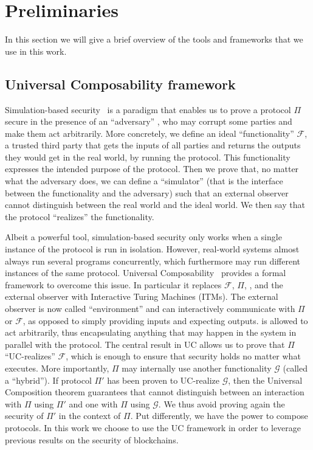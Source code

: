 \section{Preliminaries}
  In this section we will give a brief overview of the tools and frameworks that
  we use in this work.

  \subsection{Universal Composability framework}
    Simulation-based security~\cite{howtosimulateit} is a paradigm that enables
    us to prove a protocol $\Pi$ secure in the presence of an ``adversary''
    \adversary, who may corrupt some parties and make them act arbitrarily.
     More concretely, we define an
    ideal ``functionality'' $\mathcal{F}$, a trusted third party that gets the
    inputs of all parties and returns the outputs they would get in the real
    world, by running the protocol. This functionality expresses the intended
    purpose of the protocol. Then we prove that, no matter what the adversary
    does, we can define a ``simulator'' \simulator{} (that is the interface
    between the functionality and the adversary) such that an external observer
    cannot distinguish between the real world and the ideal world. We then say
    that the protocol ``realizes'' the functionality.

    Albeit a powerful tool, simulation-based security only works when a single
    instance of the protocol is run in isolation. However, real-world systems
    almost always run several programs concurrently, which furthermore may run
    different instances of the same protocol. Universal Composability~\cite{uc}
    provides a formal framework to overcome this issue. In particular it
    replaces $\mathcal{F}$, $\Pi$, \adversary{}, \simulator{} and the external
    observer with Interactive Turing Machines (ITMs). The external observer is
    now called ``environment'' \environment{} and can interactively communicate
    with $\Pi$ or $\mathcal{F}$, as opposed to simply providing inputs and
    expecting outputs. \environment{} is allowed to act arbitrarily, thus
    encapsulating anything that may happen in the system in parallel with the
    protocol. The central result in UC allows us to prove that $\Pi$
    ``UC-realizes'' $\mathcal{F}$, which is enough to ensure that security holds
    no matter what \environment{} executes. More importantly, $\Pi$ may
    internally use another functionality $\mathcal{G}$ (called a ``hybrid''). If
    protocol $\Pi'$ has been proven to UC-realize $\mathcal{G}$, then the
    Universal Composition theorem guarantees that \environment{} cannot
    distinguish between an interaction with $\Pi$ using $\Pi'$ and one with
    $\Pi$ using $\mathcal{G}$. We thus avoid proving again the security of
    $\Pi'$ in the context of $\Pi$. Put differently, we have the power to
    compose protocols. In this work we choose to use the UC framework in order
    to leverage previous results on the security of blockchains.

